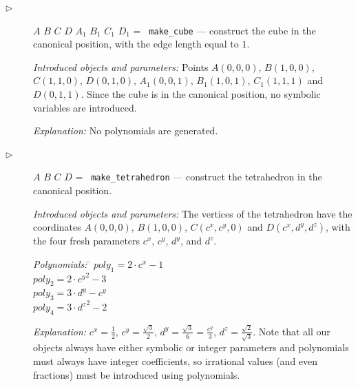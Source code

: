 \documentclass[final,1p,times,authoryear]{elsarticle}
\begin{document}
\begin{description}
\item[$\triangleright$] $A$ $B$ $C$ $D$ $A_1$ $B_1$ $C_1$ $D_1$ = {\tt
    make\_cube} --- construct the cube in the canonical position, with
  the edge length equal to $1$.

  {\em Introduced objects and parameters:} Points $A(0, 0, 0)$,
  $B(1, 0, 0)$, $C(1, 1, 0)$, $D(0, 1, 0)$, $A_1(0, 0, 1)$,
  $B_1(1, 0, 1)$, $C_1(1, 1, 1)$ and $D(0, 1, 1)$. Since the cube is
  in the canonical position, no symbolic variables are introduced.

  {\em Explanation:} No polynomials are generated.

\item[$\triangleright$] $A$ $B$ $C$ $D$ = {\tt
    make\_tetrahedron} \label{tetrahedron} --- construct the
  tetrahedron in the
  canonical position.

  {\em Introduced objects and parameters:} The vertices of the
  tetrahedron have the coordinates $A(0, 0, 0)$, $B(1, 0, 0)$,
  $C(c^x, c^y, 0)$ and $D(c^x, d^y, d^z)$, with the four fresh
  parameters $c^x$, $c^y$, $d^y$, and $d^z$.

\begin{tabbing}
{\em Polynomials:} \= $poly_1 = 2\cdot c^x - 1$ \\
                   \> $poly_2 = 2\cdot {c^y}^2 - 3$ \\
                   \> $poly_3 = 3\cdot d^y - c^y$ \\
                   \> $poly_4 = 3\cdot {d^z}^2 - 2$
\end{tabbing}

{\em Explanation:} $c^x = \frac{1}{2}$, $c^y = \frac{\sqrt{3}}{2}$,
$d^y = \frac{\sqrt{3}}{6} = \frac{c^y}{3}$,
$d^z = \frac{\sqrt{2}}{\sqrt{3}}$. Note that all our objects always
have either symbolic or integer parameters and polynomials must always
have integer coefficients, so irrational values (and even fractions)
must be introduced using polynomials.




\end{description}
\end{document}
